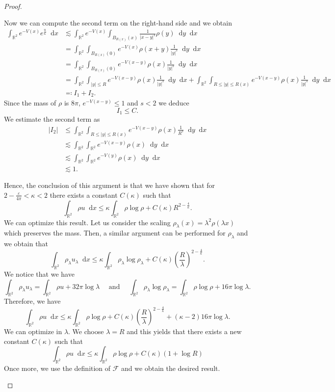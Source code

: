 \documentclass[11pt,a4paper]{article}
\numberwithin{equation}{section}
\newcommand{\R}{{\mathbb{R}}}
\theoremstyle{plain}
\theoremstyle{remark}
\newcommand {\f}{\frac}
\newcommand{\diff}{\mathop{}\!\mathrm{d}}
\begin{document}
\begin{proof}
\begin{enumeratesteps}
Now we can compute the second term on the right-hand side and we obtain 
\begin{align*}
\int_{\R^2}e^{-V(x)}e^{\f{u}{\kappa}}\diff x &\lesssim \int_{\R^2} e^{-V(x)}\int_{B_{R(x)}(x)}\f{1}{|x-y|^s}\rho(y)\diff y\diff x\\
&= \int_{\R^2}\int_{B_{R(x)}(0)} e^{-V(x)}\rho(x+y)\f{1}{|y|^s}\diff y\diff x\\
&= \int_{\R^2}\int_{B_{R(x)}(0)} e^{-V(x-y)}\rho(x)\f{1}{|y|^s}\diff y\diff x\\
&=  \int_{\R^2}\int_{|y|\le R} e^{-V(x-y)}\rho(x)\f{1}{|y|^s}\diff y\diff x + \int_{\R^2}\int_{R\le |y|\le R(x)} e^{-V(x-y)}\rho(x)\f{1}{|y|^s}\diff y\diff x\\
&\eqqcolon I_{1}+ I_{2}.
\end{align*}
Since the mass of $\rho$ is $8\pi$,  $e^{-V(x-y)}\le 1$ and $s<2$ we deduce 
$$
I_{1}\le C. 
$$
We estimate the second term as
\begin{align*}
|I_2| &\le \int_{\R^2}\int_{R\le |y|\le R(x)} e^{-V(x-y)}\rho(x)\f{1}{R^s}\diff y\diff x  \\
&\lesssim \int_{\R^2}\int_{\R^2} e^{-V(x-y)}\rho(x)\diff y\diff x\\
&\lesssim \int_{\R^2}\int_{\R^2} e^{-V(y)}\rho(x)\diff y\diff x\\
&\lesssim 1.
\end{align*}

\fi
%
Hence, the conclusion of this argument is that we have shown that for $2 - \f{\varepsilon}{4\pi}<\kappa<2$ there exists a  constant $C(\kappa)$ such that
$$
\int_{\R^2}\rho u\diff x \le \kappa\int_{\R^2}\rho\log\rho +C(\kappa)R^{2-\frac{4}{\kappa}}. 
$$
We can optimize this result. Let us consider the scaling $\rho_{\lambda}(x)=\lambda^{2}\rho(\lambda x)$ which preserves the mass. Then, a similar argument can be performed for $\rho_{\lambda}$ and we obtain that
$$
    \int_{\R^2}\rho_{\lambda} u_{\lambda}\diff x \le \kappa\int_{\R^2}\rho_\lambda\log\rho_\lambda +C(\kappa)\left(\frac{R}{\lambda}\right)^{2-\frac{4}{\kappa}}. 
$$
We notice that we have
\begin{equation*}
    \int_{\R^2}\rho_{\lambda} u_{\lambda} = \int_{\R^2}\rho u + 32\pi \log\lambda\quad \mbox{ and }\quad\int_{\R^2}\rho_{\lambda}\log\rho_{\lambda}= \int_{\R^2}\rho\log\rho + 16\pi \log\lambda.  
\end{equation*}
Therefore, we have
$$
    \int_{\R^2}\rho u\diff x \le \kappa\int_{\R^2}\rho\log\rho +C(\kappa)\left(\frac{R}{\lambda}\right)^{2-\frac{4}{\kappa}}+(\kappa-2) 16\pi\log\lambda. 
$$
We can optimize  in $\lambda$. We choose $\lambda=R$ and this yields that there exists a new constant $C(\kappa)$ such that 
$$
    \int_{\R^2}\rho u\diff x \le \kappa\int_{\R^2}\rho\log\rho +C(\kappa)(1+\log R)
$$
Once more, we use the definition of $\mathcal F$ and we obtain the desired result. \qedhere
\end{enumeratesteps}
\end{proof}
\end{document}
